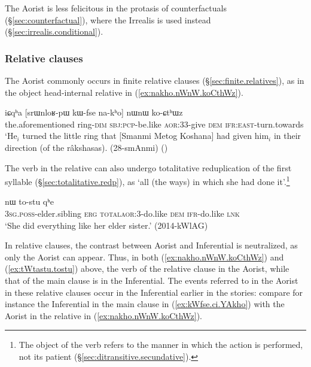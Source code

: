The Aorist is less felicitous in the protasis of counterfactuals (§\ref{sec:counterfactual}), where the Irrealis is used instead (§\ref{sec:irrealis.conditional}).

\subsubsection{Relative clauses }   \label{sec:aor.relative}
The Aorist commonly occurs in finite relative clauses (§\ref{sec:finite.relatives}), as in the object head-internal relative in (\ref{ex:nakho.nWnW.koCthWz}).


\begin{exe}
\ex \label{ex:nakho.nWnW.koCthWz}
\gll iɕqʰa [srɯnloʁ-pɯ kɯ-fse na-kʰo] nɯnɯ ko-ɕtʰɯz \\
the.aforementioned ring-\textsc{dim} \textsc{sbj}:\textsc{pcp}-be.like \textsc{aor}:3\fl{}3-give \textsc{dem} \textsc{ifr}:\textsc{east}-turn.towards \\
\glt `He$_i$ turned the little ring that [Smanmi Metog Koshana] had given him$_i$ in their direction (of the râkshasas). (28-smAnmi) ()
\end{exe}
 
The verb in the relative can also undergo totalitative reduplication of the first syllable (§\ref{sec:totalitative.redp}), as  `all (the ways) in which she had done it'.\footnote{The object of the verb  refers to the manner in which the action is performed, not its patient (§\ref{sec:ditransitive.secundative}). }

\begin{exe}
\ex \label{ex:tWtastu.tostu}
 nɯ to-stu qʰe \\
\textsc{3sg}.\textsc{poss}-elder.sibling \textsc{erg} \textsc{total}\redp{}\textsc{aor}:3\flobv{}-do.like \textsc{dem} \textsc{ifr}-do.like \textsc{lnk} \\
\glt `She did everything like her elder sister.' (2014-kWlAG)
\end{exe}

In relative clauses, the contrast between Aorist and Inferential is neutralized, as only the Aorist can appear. Thus, in both (\ref{ex:nakho.nWnW.koCthWz}) and (\ref{ex:tWtastu.tostu}) above, the verb of the relative clause in the Aorist, while that of the main clause is in the Inferential. The events referred to in the Aorist in these relative clauses occur in the Inferential earlier in the stories: compare for instance the Inferential  in the main clause in (\ref{ex:kWfse.ci.YAkho}) with the Aorist  in the relative in (\ref{ex:nakho.nWnW.koCthWz}).

